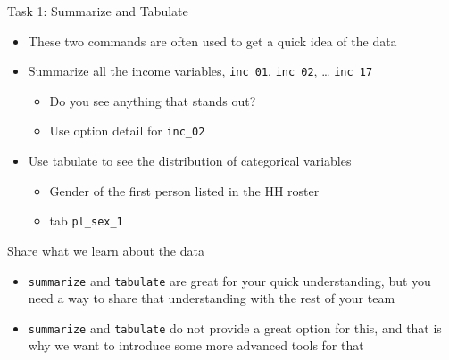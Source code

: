 \documentclass[aspectratio=169]{beamer}
\begin{document}
\begin{frame}{Task 1: Summarize and Tabulate}
	\begin{itemize}
		\item These two commands are often used to get a quick idea of the data
		\item Summarize all the income variables, \texttt{inc\_01}, \texttt{inc\_02}, … \texttt{inc\_17}
		\begin{itemize}
			\item Do you see anything that stands out?
			\item Use option detail for \texttt{inc\_02}
		\end{itemize}
		\item Use tabulate to see the distribution of categorical variables
		\begin{itemize}
			\item Gender of the first person listed in the HH roster
			\item tab \texttt{pl\_sex\_1}
		\end{itemize}
	\end{itemize}
\end{frame}

\begin{frame}{Share what we learn about the data }
	\begin{itemize}
		\item \texttt{summarize} and \texttt{tabulate} are great for your quick understanding, but you need a way to share that understanding with the rest of your team
		\item \texttt{summarize} and \texttt{tabulate} do not provide a great option for this, and that is why we want to introduce some more advanced tools for that
	\end{itemize}
\end{frame}
\end{document}
